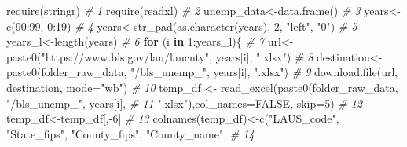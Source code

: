\documentclass[
]{book}
\newenvironment{Shaded}{\begin{snugshade}}{\end{snugshade}}
\newcommand{\AttributeTok}[1]{\textcolor[rgb]{0.77,0.63,0.00}{#1}}
\newcommand{\CommentTok}[1]{\textcolor[rgb]{0.56,0.35,0.01}{\textit{#1}}}
\newcommand{\ConstantTok}[1]{\textcolor[rgb]{0.00,0.00,0.00}{#1}}
\newcommand{\ControlFlowTok}[1]{\textcolor[rgb]{0.13,0.29,0.53}{\textbf{#1}}}
\newcommand{\DecValTok}[1]{\textcolor[rgb]{0.00,0.00,0.81}{#1}}
\newcommand{\FunctionTok}[1]{\textcolor[rgb]{0.00,0.00,0.00}{#1}}
\newcommand{\NormalTok}[1]{#1}
\newcommand{\OtherTok}[1]{\textcolor[rgb]{0.56,0.35,0.01}{#1}}
\newcommand{\SpecialCharTok}[1]{\textcolor[rgb]{0.00,0.00,0.00}{#1}}
\newcommand{\StringTok}[1]{\textcolor[rgb]{0.31,0.60,0.02}{#1}}
\begin{document}
\begin{Shaded}
\begin{Highlighting}[]
\FunctionTok{require}\NormalTok{(stringr)                                                                }\CommentTok{\# 1}
\FunctionTok{require}\NormalTok{(readxl)                                                                 }\CommentTok{\# 2}
\NormalTok{unemp\_data}\OtherTok{\textless{}{-}}\FunctionTok{data.frame}\NormalTok{()                                                        }\CommentTok{\# 3}
\NormalTok{years}\OtherTok{\textless{}{-}}\FunctionTok{c}\NormalTok{(}\DecValTok{90}\SpecialCharTok{:}\DecValTok{99}\NormalTok{, }\DecValTok{0}\SpecialCharTok{:}\DecValTok{19}\NormalTok{)                                                           }\CommentTok{\# 4}
\NormalTok{years}\OtherTok{\textless{}{-}}\FunctionTok{str\_pad}\NormalTok{(}\FunctionTok{as.character}\NormalTok{(years), }\DecValTok{2}\NormalTok{, }\StringTok{"left"}\NormalTok{, }\StringTok{"0"}\NormalTok{)                             }\CommentTok{\# 5}
\NormalTok{years\_l}\OtherTok{\textless{}{-}}\FunctionTok{length}\NormalTok{(years)                                                          }\CommentTok{\# 6}
\ControlFlowTok{for}\NormalTok{ (i }\ControlFlowTok{in} \DecValTok{1}\SpecialCharTok{:}\NormalTok{years\_l)\{                                                           }\CommentTok{\# 7}
\NormalTok{url}\OtherTok{\textless{}{-}}\FunctionTok{paste0}\NormalTok{(}\StringTok{"https://www.bls.gov/lau/laucnty"}\NormalTok{, years[i], }\StringTok{".xlsx"}\NormalTok{)               }\CommentTok{\# 8}
\NormalTok{destination}\OtherTok{\textless{}{-}}\FunctionTok{paste0}\NormalTok{(folder\_raw\_data, }\StringTok{"/bls\_unemp\_"}\NormalTok{, years[i], }\StringTok{".xlsx"}\NormalTok{)          }\CommentTok{\# 9}
\FunctionTok{download.file}\NormalTok{(url, destination, }\AttributeTok{mode=}\StringTok{"wb"}\NormalTok{)                                     }\CommentTok{\# 10}
\NormalTok{temp\_df }\OtherTok{\textless{}{-}} \FunctionTok{read\_excel}\NormalTok{(}\FunctionTok{paste0}\NormalTok{(folder\_raw\_data, }\StringTok{"/bls\_unemp\_"}\NormalTok{, years[i],         }\CommentTok{\# 11}
  \StringTok{".xlsx"}\NormalTok{),}\AttributeTok{col\_names=}\ConstantTok{FALSE}\NormalTok{, }\AttributeTok{skip=}\DecValTok{5}\NormalTok{)                                            }\CommentTok{\# 12}
\NormalTok{temp\_df}\OtherTok{\textless{}{-}}\NormalTok{temp\_df[,}\SpecialCharTok{{-}}\DecValTok{6}\NormalTok{]                                                          }\CommentTok{\# 13}
\FunctionTok{colnames}\NormalTok{(temp\_df)}\OtherTok{\textless{}{-}}\FunctionTok{c}\NormalTok{(}\StringTok{"LAUS\_code"}\NormalTok{, }\StringTok{"State\_fips"}\NormalTok{, }\StringTok{"County\_fips"}\NormalTok{, }\StringTok{"County\_name"}\NormalTok{,  }\CommentTok{\# 14}

\end{Highlighting}
\end{Shaded}
\end{document}
